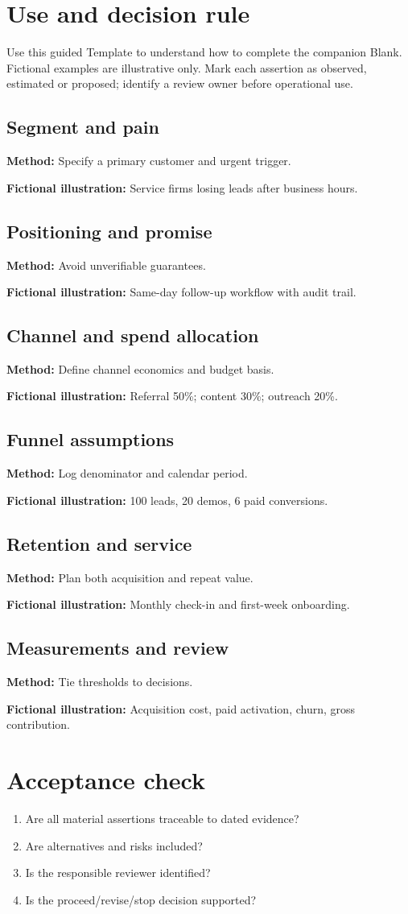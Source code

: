 \documentclass[11pt]{article}
\begin{document}
\SuiteOpen
\section{Use and decision rule}
Use this guided Template to understand how to complete the companion Blank. Fictional examples are illustrative only. Mark each assertion as observed, estimated or proposed; identify a review owner before operational use.
\subsection*{Segment and pain}
\textbf{Method:} Specify a primary customer and urgent trigger.\par\textbf{Fictional illustration:} Service firms losing leads after business hours.\par
\subsection*{Positioning and promise}
\textbf{Method:} Avoid unverifiable guarantees.\par\textbf{Fictional illustration:} Same-day follow-up workflow with audit trail.\par
\subsection*{Channel and spend allocation}
\textbf{Method:} Define channel economics and budget basis.\par\textbf{Fictional illustration:} Referral 50\%; content 30\%; outreach 20\%.\par
\subsection*{Funnel assumptions}
\textbf{Method:} Log denominator and calendar period.\par\textbf{Fictional illustration:} 100 leads, 20 demos, 6 paid conversions.\par
\subsection*{Retention and service}
\textbf{Method:} Plan both acquisition and repeat value.\par\textbf{Fictional illustration:} Monthly check-in and first-week onboarding.\par
\subsection*{Measurements and review}
\textbf{Method:} Tie thresholds to decisions.\par\textbf{Fictional illustration:} Acquisition cost, paid activation, churn, gross contribution.\par
\section{Acceptance check}
\begin{enumerate}[leftmargin=*,itemsep=5pt]
\item Are all material assertions traceable to dated evidence?
\item Are alternatives and risks included?
\item Is the responsible reviewer identified?
\item Is the proceed/revise/stop decision supported?
\end{enumerate}
\end{document}
